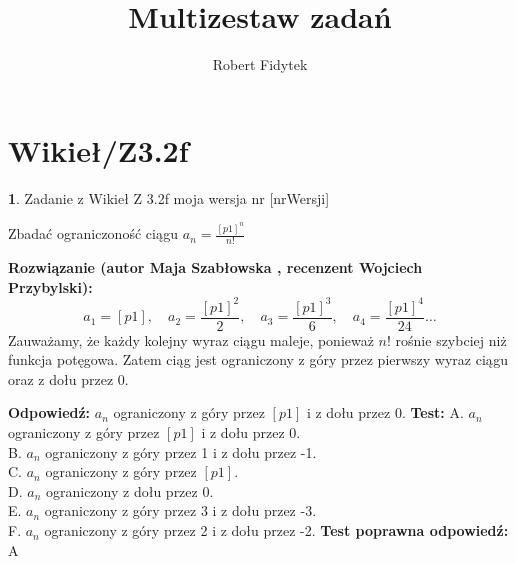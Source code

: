 \documentclass[12pt, a4paper]{article}
\title{Multizestaw zadań}
\author{Robert Fidytek}
\date{}
\theoremstyle{definition} %
\newtheorem{zad}{}
\newcommand{\kategoria}[1]{\section{#1}} %
\newcommand{\zadStart}[1]{\begin{zad}#1\newline} %
\newcommand{\zadStop}{\end{zad}}   %
\newcommand{\rozwStart}[2]{\noindent \textbf{Rozwiązanie (autor #1 , recenzent #2): }\newline} %
\newcommand{\rozwStop}{\newline}                                            %
\newcommand{\odpStart}{\noindent \textbf{Odpowiedź:}\newline}    %
\newcommand{\odpStop}{\newline}                                             %
\newcommand{\testStart}{\noindent \textbf{Test:}\newline} %
\newcommand{\testStop}{\newline} %
\newcommand{\kluczStart}{\noindent \textbf{Test poprawna odpowiedź:}\newline} %
\newcommand{\kluczStop}{\newline} %
\begin{document}
\maketitle


\kategoria{Wikieł/Z3.2f}
\zadStart{Zadanie z Wikieł Z 3.2f moja wersja nr [nrWersji]}


Zbadać ograniczoność ciągu $a_{n}=\frac{[p1]^{n}}{n!}$
\zadStop

\rozwStart{Maja Szabłowska}{Wojciech Przybylski}
$$a_{1}=[p1], \quad a_{2}=\frac{[p1]^{2}}{2}, \quad a_{3}=\frac{[p1]^{3}}{6}, \quad a_{4}=\frac{[p1]^{4}}{24} \ldots$$
Zauważamy, że każdy kolejny wyraz ciągu maleje, ponieważ $n!$ rośnie szybciej niż funkcja potęgowa. Zatem ciąg jest ograniczony z góry przez pierwszy wyraz ciągu oraz z dołu przez 0.
\rozwStop


\odpStart
$a_{n}$ ograniczony z góry przez $[p1]$ i z dołu przez 0.
\odpStop
\testStart
A. $a_{n}$ ograniczony z góry przez $[p1]$ i z dołu przez 0.\\
B. $a_{n}$ ograniczony z góry przez 1 i z dołu przez -1.\\
C. $a_{n}$ ograniczony z góry przez $[p1]$.\\
D. $a_{n}$ ograniczony z dołu przez 0.\\
E. $a_{n}$ ograniczony z góry przez 3 i z dołu przez -3.\\
F. $a_{n}$ ograniczony z góry przez 2 i z dołu przez -2.
\testStop
\kluczStart
A
\kluczStop
\end{document}
